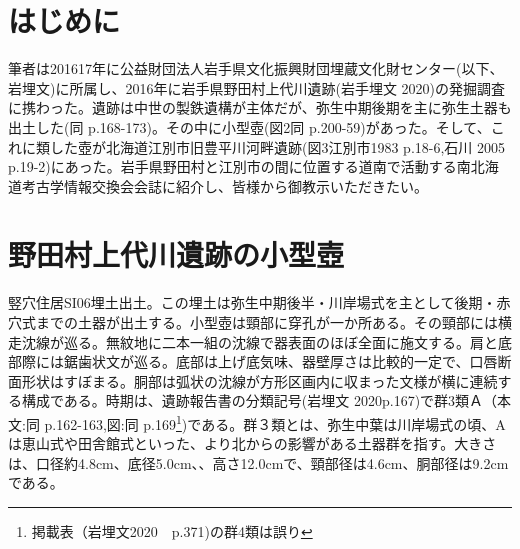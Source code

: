 \documentclass[a4j,11pt,twocolumn,openany]{jsbook}
\begin{document}
\section{はじめに}
筆者は201617年に公益財団法人岩手県文化振興財団埋蔵文化財センター(以下、岩埋文)に所属し、2016年に岩手県野田村上代川遺跡(岩手埋文 2020)の発掘調査に携わった。遺跡は中世の製鉄遺構が主体だが、弥生中期後期を主に弥生土器も出土した(同 p.168-173)。その中に小型壺(図2同 p.200-59)があった。そして、これに類した壺が北海道江別市旧豊平川河畔遺跡(図3江別市1983 p.18-6,石川 2005 p.19-2)にあった。岩手県野田村と江別市の間に位置する道南で活動する南北海道考古学情報交換会会誌に紹介し、皆様から御教示いただきたい。

\section{野田村上代川遺跡の小型壺}\label{nodamura}
竪穴住居SI06埋土出土。この埋土は弥生中期後半・川岸場式を主として後期・赤穴式までの土器が出土する。小型壺は頸部に穿孔が一か所ある。その頸部には横走沈線が巡る。無紋地に二本一組の沈線で器表面のほぼ全面に施文する。肩と底部際には鋸歯状文が巡る。底部は上げ底気味、器壁厚さは比較的一定で、口唇断面形状はすぼまる。胴部は弧状の沈線が方形区画内に収まった文様が横に連続する構成である。時期は、遺跡報告書の分類記号(岩埋文 2020p.167)で群3類Ａ（本文:同 p.162-163,図:同 p.169\footnote{
	掲載表（岩埋文2020　p.371)の群4類は誤り
})である。群３類とは、弥生中葉は川岸場式の頃、Aは恵山式や田舎館式といった、より北からの影響がある土器群を指す。大きさは、口径約4.8cm、底径5.0cm、、高さ12.0cmで、頸部径は4.6cm、胴部径は9.2cmである。
\end{document}
